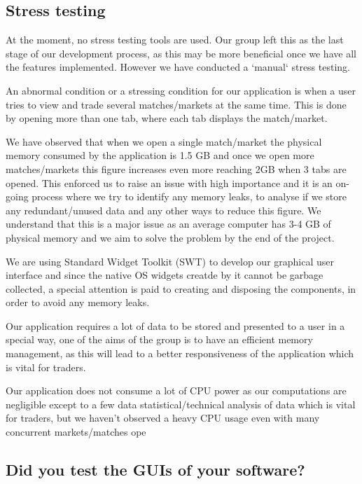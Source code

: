 \documentclass[10pt]{article}
\begin{document}
\subsection{Stress testing}

At the moment, no stress testing tools are used. Our group left this as the last stage of our development process, as this may be more beneficial once we have all the features implemented.
However we have conducted a `manual` stress testing.

An abnormal condition or a stressing condition for our application is when a user tries to view and trade several matches/markets at the same time. This is done by opening more than one tab, where each tab displays the match/market.

We have observed that when we open a single match/market the physical memory consumed by the application is 1.5 GB and once we open more matches/markets this figure increases even more reaching 2GB when 3 tabs are opened. This enforced us to raise an issue with high importance and it is an on-going process where we try to identify any memory leaks, to analyse if we store any redundant/unused data and any other ways to reduce this figure. We understand that this is a major issue as an average computer has 3-4 GB of physical memory and we aim to solve the problem by the end of the project.

We are using Standard Widget Toolkit (SWT) to develop our graphical user interface and since the native OS widgets creatde by it cannot be garbage collected, a special attention is paid to creating and disposing the components, in order to avoid any memory leaks.

Our application requires a lot of data to be stored and presented to a user in a special way, one of the aims of the group is to have an efficient memory management, as this will lead to a better responsiveness of the application which is vital for traders.

Our application does not consume a lot of CPU power as our computations are negligible except to a few data statistical/technical analysis of data which is vital for traders, but we haven’t observed a heavy CPU usage even with many concurrent markets/matches ope

\subsection{Did you test the GUIs of your software?}
\end{document}
